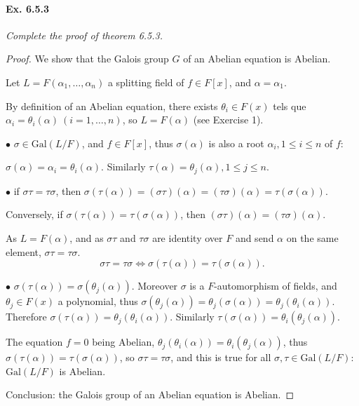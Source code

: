 \documentclass[11pt,a4paper]{article}
\newcommand{\Gal}{\mathrm{Gal}}
\begin{document}
\paragraph{Ex. 6.5.3}

{\it Complete the proof of theorem 6.5.3.
}

\begin{proof}
We show that the Galois group $G$ of an Abelian equation is Abelian. 

Let $L=F(\alpha_1,\ldots,\alpha_n)$ a splitting field of $f \in F[x]$, and $\alpha=\alpha_1$.

By definition of an Abelian equation,  there exists $\theta_i \in F(x)$ tels que $\alpha_i = \theta_i(\alpha)\ (i=1,\ldots,n)$, so $L = F(\alpha)$ (see Exercise 1).

$\bullet$ 
$\sigma \in \Gal(L/F)$, and $f\in F[x]$, thus $\sigma(\alpha)$ is also a root $\alpha_i,1\leq i \leq n$ of $f$:

 $\sigma(\alpha) = \alpha_i = \theta_i(\alpha)$. Similarly $\tau(\alpha) = \theta_j(\alpha),1\leq j\leq n$.

$\bullet$ 
if $\sigma\tau = \tau \sigma$, then $\sigma( \tau (\alpha)) = (\sigma \tau)(\alpha) = (\tau \sigma)(\alpha) = \tau(\sigma(\alpha))$.

Conversely, if $\sigma( \tau (\alpha))  = \tau(\sigma(\alpha))$, then $(\sigma \tau)(\alpha) = (\tau \sigma)(\alpha)$.

As $L = F(\alpha)$, and as  $\sigma \tau$ and $\tau \sigma$ are identity over $F$ and send $\alpha$ on the same element, $\sigma\tau = \tau \sigma$.
$$\sigma \tau = \tau \sigma \iff \sigma( \tau (\alpha))  = \tau(\sigma(\alpha)).$$

$\bullet$ $\sigma(\tau(\alpha)) = \sigma(\theta_j(\alpha))$.
Moreover $\sigma$ is a $F$-automorphism of fields, and $\theta_j \in F(x)$ a polynomial, thus $\sigma(\theta_j(\alpha)) = \theta_j(\sigma(\alpha)) = \theta_j(\theta_i(\alpha))$. Therefore 
$\sigma(\tau(\alpha)) = \theta_j(\theta_i(\alpha))$. Similarly $\tau(\sigma(\alpha)) = \theta_i(\theta_j(\alpha))$.

The equation $f=0$ being Abelian, $\theta_j(\theta_i(\alpha)) = \theta_i(\theta_j(\alpha))$, thus $\sigma(\tau(\alpha)) = \tau(\sigma(\alpha))$, so $\sigma \tau=\tau \sigma$, and this is true for all  $\sigma,\tau \in \Gal(L/F)$: $\Gal(L/F)$ is Abelian.

Conclusion: the Galois group of an Abelian equation is Abelian. 
\end{proof}
\end{document}
